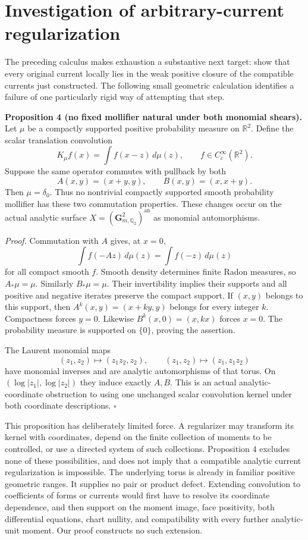 \documentclass[
  11pt,
]{article}
\begin{document}
\section{Investigation of arbitrary-current
regularization}\label{investigation-of-arbitrary-current-regularization}

The preceding calculus makes exhaustion a substantive next target: show
that every original current locally lies in the weak positive closure of
the compatible currents just constructed. The following small geometric
calculation identifies a failure of one particularly rigid way of
attempting that step.

\textbf{Proposition 4 (no fixed mollifier natural under both monomial
shears).} Let \(\mu\) be a compactly supported positive probability
measure on \(\mathbb R^2\). Define the scalar translation convolution
\[K_\mu f(x)=\int f(x-z)\,d\mu(z),\qquad f\in C_c^\infty(\mathbb R^2).\]
Suppose the same operator commutes with pullback by both
\[ A(x,y)=(x+y,y),\qquad B(x,y)=(x,x+y).\] Then \(\mu=\delta_0\). Thus
no nontrivial compactly supported smooth probability mollifier has these
two commutation properties. These changes occur on the actual analytic
surface \(X=(\mathbf G_{m,\mathbb Q_2}^2)^{\mathrm{an}}\) as monomial
automorphisms.

\emph{Proof.} Commutation with \(A\) gives, at \(x=0\),
\[\int f(-Az)\,d\mu(z)=\int f(-z)\,d\mu(z)\] for all compact smooth
\(f\). Smooth density determines finite Radon measures, so
\(A_*\mu=\mu\). Similarly \(B_*\mu=\mu\). Their invertibility implies
their supports and all positive and negative iterates preserve the
compact support. If \((x,y)\) belongs to this support, then
\(A^k(x,y)=(x+ky,y)\) belongs for every integer \(k\). Compactness
forces \(y=0\). Likewise \(B^k(x,0)=(x,kx)\) forces \(x=0\). The
probability measure is supported on \(\{0\}\), proving the assertion.

The Laurent monomial maps \[ (z_1,z_2)\longmapsto(z_1z_2,z_2),\qquad
   (z_1,z_2)\longmapsto(z_1,z_1z_2)\] have monomial inverses and are
analytic automorphisms of that torus. On \((\log|z_1|,\log|z_2|)\) they
induce exactly \(A,B\). This is an actual analytic-coordinate
obstruction to using one unchanged scalar convolution kernel under both
coordinate descriptions. \(\square\)

This proposition has deliberately limited force. A regularizer may
transform its kernel with coordinates, depend on the finite collection
of moments to be controlled, or use a directed system of such
collections. Proposition 4 excludes none of these possibilities, and
does not imply that a compatible analytic current regularization is
impossible. The underlying torus is already in familiar positive
geometric ranges. It supplies no pair or product defect. Extending
convolution to coefficients of forms or currents would first have to
resolve its coordinate dependence, and then support on the moment image,
face positivity, both differential equations, chart nullity, and
compatibility with every further analytic-unit moment. Our proof
constructs no such extension.
\end{document}
